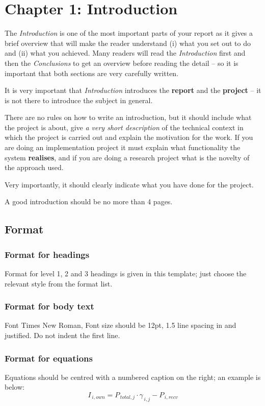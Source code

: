\section*{Chapter 1: Introduction}
\setcounter{section}{1} \setcounter{subsection}{0}

The \textit{Introduction} is one of the most important parts of your report as it gives a brief overview that will make the reader understand (i) what you set out to do and (ii) what you achieved. Many readers will read the \textit{Introduction} first and then the  \textit{Conclusions} to get an overview before reading the detail – so it is important that both sections are very carefully written.

It is very important that \textit{Introduction} introduces the \textbf{report} and the \textbf{project} – it is not there to introduce the subject in general.

There are no rules on how to write an introduction, but it should include what the project is about, give \textit{a very short description} of the technical context in which the project is carried out and explain the motivation for the work. If you are doing an implementation project it must explain what functionality the system \textbf{realises}, and if you are doing a research project what is the novelty of the approach used. 

Very importantly, it should clearly indicate what you have done for the project. 

A good introduction should be no more than 4 pages.
\subsection{Format}
\subsubsection{Format for headings}
Format for level 1, 2 and 3 headings is given in this template; just choose the relevant style from the format list.

\subsubsection{Format for body text}
Font Times New Roman, Font size should be 12pt, 1.5 line spacing in and justified. Do not indent the first line.

\subsubsection{Format for equations}
Equations should be centred with a numbered caption on the right; an example is below:
\begin{equation}
I_{\,i, own}=P_{\,total, j} \cdot \gamma_{\,i, j} - P_{\,i,recv}
\end{equation}

